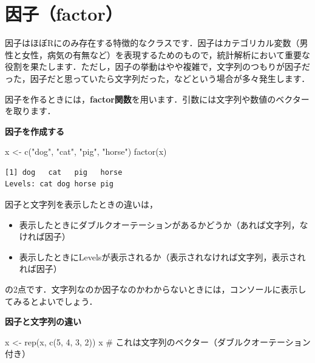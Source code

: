\documentclass[
  letterpaper,
  DIV=11,
  numbers=noendperiod]{scrreprt}
\newenvironment{Shaded}{\begin{snugshade}}{\end{snugshade}}
\newcommand{\CommentTok}[1]{\textcolor[rgb]{0.37,0.37,0.37}{#1}}
\newcommand{\DecValTok}[1]{\textcolor[rgb]{0.68,0.00,0.00}{#1}}
\newcommand{\FunctionTok}[1]{\textcolor[rgb]{0.28,0.35,0.67}{#1}}
\newcommand{\NormalTok}[1]{\textcolor[rgb]{0.00,0.23,0.31}{#1}}
\newcommand{\OtherTok}[1]{\textcolor[rgb]{0.00,0.23,0.31}{#1}}
\newcommand{\StringTok}[1]{\textcolor[rgb]{0.13,0.47,0.30}{#1}}
\providecommand{\tightlist}{%
  \setlength{\itemsep}{0pt}\setlength{\parskip}{0pt}}\usepackage{longtable,booktabs,array}
\begin{document}

\hypertarget{ux56e0ux5b50factor-1}{%
\chapter{因子（factor）}\label{ux56e0ux5b50factor-1}}

因子はほぼRにのみ存在する特徴的なクラスです．因子はカテゴリカル変数（男性と女性，病気の有無など）を表現するためのもので，統計解析において重要な役割を果たします．ただし，因子の挙動はやや複雑で，文字列のつもりが因子だった，因子だと思っていたら文字列だった，などという場合が多々発生します．

因子を作るときには，\textbf{factor関数}を用います．引数には文字列や数値のベクターを取ります．

\textbf{因子を作成する}

\begin{Shaded}
\begin{Highlighting}[]
\NormalTok{x }\OtherTok{\textless{}{-}} \FunctionTok{c}\NormalTok{(}\StringTok{"dog"}\NormalTok{, }\StringTok{"cat"}\NormalTok{, }\StringTok{"pig"}\NormalTok{, }\StringTok{"horse"}\NormalTok{)}
\FunctionTok{factor}\NormalTok{(x)}
\end{Highlighting}
\end{Shaded}

\begin{verbatim}
[1] dog   cat   pig   horse
Levels: cat dog horse pig
\end{verbatim}

因子と文字列を表示したときの違いは，

\begin{itemize}
\tightlist
\item
  表示したときにダブルクオーテーションがあるかどうか（あれば文字列，なければ因子）
\item
  表示したときにLevelsが表示されるか（表示されなければ文字列，表示されれば因子）
\end{itemize}

の2点です．文字列なのか因子なのかわからないときには，コンソールに表示してみるとよいでしょう．

\textbf{因子と文字列の違い}

\begin{Shaded}
\begin{Highlighting}[]
\NormalTok{x }\OtherTok{\textless{}{-}} \FunctionTok{rep}\NormalTok{(x, }\FunctionTok{c}\NormalTok{(}\DecValTok{5}\NormalTok{, }\DecValTok{4}\NormalTok{, }\DecValTok{3}\NormalTok{, }\DecValTok{2}\NormalTok{))}
\NormalTok{x }\CommentTok{\# これは文字列のベクター（ダブルクオーテーション付き）}
\end{Highlighting}
\end{Shaded}
\end{document}
